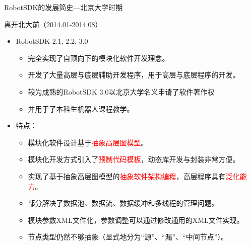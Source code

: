 \documentclass[9pt]{beamer}
\begin{document}
	\begin{frame}{RobotSDK的发展简史---北京大学时期}
		\begin{block}{离开北大前（2014.01-2014.08）}
			\begin{itemize}
				\item RobotSDK 2.1, 2.2, 3.0
				\begin{itemize}
					\item 完全实现了自顶向下的模块化软件开发理念。
					\item 开发了大量高层与底层辅助开发程序，用于高层与底层程序的开发。
					\item 较为成熟的RobotSDK 3.0以北京大学名义申请了软件著作权
					\item 并用于了本科生机器人课程教学。	
				\end{itemize}
				\item 特点：
				\begin{itemize}
					\item 模块化软件设计基于\textcolor{red}{抽象高层图模型}。
					\item 模块化开发方式引入了\textcolor{red}{预制代码模板}，动态库开发与封装非常方便。
					\item 实现了基于抽象高层图模型的\textcolor{red}{抽象软件架构编程}，高层程序具有\textcolor{red}{泛化能力}。
					\item 部分解决了数据池、数据流、数据缓冲和多线程的管理问题。
					\item 模块参数XML文件化，参数调整可以通过修改通用的XML文件实现。
					\item 节点类型仍然不够抽象（显式地分为“源”、“漏”、“中间节点”）。
				\end{itemize}
			\end{itemize}
		\end{block}
	\end{frame}
	
\end{document}
